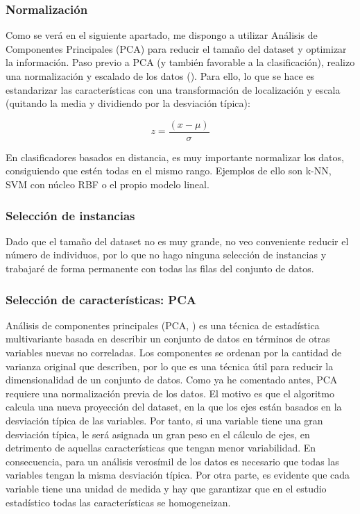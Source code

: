 \subsubsection{Normalización}

Como se verá en el siguiente apartado, me dispongo a utilizar Análisis de Componentes Principales (PCA) para reducir el tamaño del dataset y optimizar la información. Paso previo a PCA (y también favorable a la clasificación), realizo una normalización y escalado de los datos (\cite{st-sc}). Para ello, lo que se hace es estandarizar las características con una transformación de localización y escala (quitando la media y dividiendo por la desviación típica):

$$ z = \frac{(x-\mu)}{\sigma} $$ 


En clasificadores basados en distancia, es muy importante normalizar los datos, consiguiendo que estén todas en el mismo rango. Ejemplos de ello son k-NN, SVM con núcleo RBF o el propio modelo lineal.

\subsubsection{Selección de instancias}

Dado que el tamaño del dataset no es muy grande, no veo conveniente reducir el número de individuos, por lo que no hago ninguna selección de instancias y trabajaré de forma permanente con todas las filas del conjunto de datos.

\subsubsection{Selección de características: PCA}

Análisis de componentes principales (PCA, \cite{pca}) es una técnica de estadística multivariante basada en describir un conjunto de datos en términos de otras variables nuevas no correladas. Los componentes se ordenan por la cantidad de varianza original que describen, por lo que es una técnica útil para reducir la dimensionalidad de un conjunto de datos. Como ya he comentado antes, PCA requiere una normalización previa de los datos. El motivo es que el algoritmo calcula una nueva proyección del dataset, en la que los ejes están basados en la desviación típica de las variables. Por tanto, si una variable tiene una gran desviación típica, le será asignada un gran peso en el cálculo de ejes, en detrimento de aquellas características que tengan menor variabilidad. En consecuencia, para un análisis verosímil de los datos es necesario que todas las variables tengan la misma desviación típica. Por otra parte, es evidente que cada variable tiene una unidad de medida y hay que garantizar que en el estudio estadístico todas las características se homogeneizan. 


